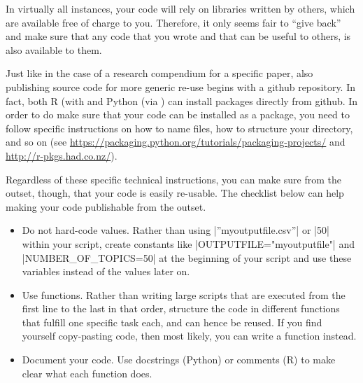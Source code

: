 In virtually all instances, your code will rely on libraries written
by others, which are available free of charge to you. Therefore,
it only seems fair to ``give back'' and make sure that any code that
you wrote and that can be useful to others, is also available to them.

Just like in the case of a research compendium for a specific paper,
also publishing source code for more generic re-use begins with a
github repository. In fact, both R (with  and Python
(via ) can install packages directly from github. In order
to do make sure that your code can be installed as a package, you
need to follow specific instructions on how to name files, how to
structure your directory, and so on (see \url{https://packaging.python.org/tutorials/packaging-projects/}
and \url{http://r-pkgs.had.co.nz/}).

Regardless of these specific technical instructions, you can make
sure from the outset, though, that your code is easily re-usable.
The checklist below can help making your code publishable from the
outset.

\begin{itemize}
\item Do not hard-code values. Rather than using |''myoutputfile.csv''| or |50| within your script, create constants like |OUTPUTFILE="myoutputfile"| and |NUMBER_OF_TOPICS=50| at the beginning of your script and use these variables instead of the values later on.
\item Use functions. Rather than writing large scripts that are executed from the first line to the last in that order, structure the code in different functions that fulfill one specific task each, and can hence be reused. If you find yourself copy-pasting code, then most likely, you can write a function instead.
\item Document your code. Use docstrings (Python) or comments (R) to make clear what each function does.
\end{itemize}

